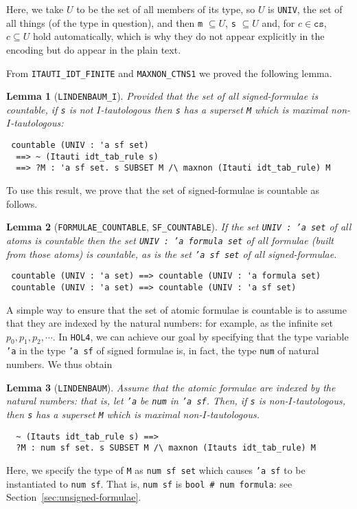 \documentclass[a4paper]{article}
\newtheorem{lemma}{Lemma}
\newcommand{\hol}{\texttt{HOL4}}
\begin{document}
Here, we take $U$ to be the set of all
members of its type, so $U$ is \texttt{UNIV}, the set of all things
(of the type in question), and then
\texttt{m} $\subseteq U$, \texttt{s} $\subseteq U$ and,
for $c \in \texttt{cs}$, $c \subseteq U$ hold automatically, which is
why they do not appear explicitly in the encoding but do appear in the
plain text.

From \texttt{ITAUTI\_IDT\_FINITE} and \texttt{MAXNON\_CTNS1} we proved
the following lemma.
\begin{lemma}[\texttt{LINDENBAUM\_I}]\label{LINDENBAUM-I}
  Provided that the set of all signed-formulae is countable, 
  if \texttt{s} is not $I$-tautologous then \texttt{s} has a superset 
\texttt{M} which is maximal non-$I$-tautologous:
\end{lemma}
\begin{verbatim}
 countable (UNIV : 'a sf set) 
  ==> ~ (Itauti idt_tab_rule s) 
  ==> ?M : 'a sf set. s SUBSET M /\ maxnon (Itauti idt_tab_rule) M
\end{verbatim}

To use this result, we prove that
the set of signed-formulae is countable as follows.
\begin{lemma}[\texttt{FORMULAE\_COUNTABLE}, \texttt{SF\_COUNTABLE}]
\label{FORMULAE-COUNTABLE}
\label{SF-COUNTABLE}
If the set \texttt{UNIV : 'a set} of all atoms is countable then the set
\texttt{UNIV : 'a formula set} of all formulae (built from
those atoms) is countable, as is the set
\texttt{'a sf set} of all signed-formulae.
\end{lemma}
\begin{verbatim}
 countable (UNIV : 'a set) ==> countable (UNIV : 'a formula set)
 countable (UNIV : 'a set) ==> countable (UNIV : 'a sf set)
\end{verbatim}

A simple way to ensure that the set of atomic formulae is countable is
to assume that they are indexed by the natural numbers: for example,
as the infinite set $p_0, p_1, p_2, \cdots$. In \hol{}, we can achieve
our goal by specifying that the type variable \texttt{'a} in the type
\texttt{'a sf} of signed formulae is, in fact, the type \texttt{num}
of natural numbers. 
We thus obtain %

\begin{lemma}[\texttt{LINDENBAUM}]\label{LINDENBAUM}
  Assume that the atomic formulae are indexed by the natural numbers:
  that is, let \texttt{'a} be \texttt{num} in \texttt{'a sf}.
  Then, if \texttt{s} is non-$I$-tautologous, then \texttt{s}
  has a superset \texttt{M} which is maximal non-$I$-tautologous.
\end{lemma}
\begin{verbatim}
  ~ (Itauts idt_tab_rule s) ==>
  ?M : num sf set. s SUBSET M /\ maxnon (Itauts idt_tab_rule) M
\end{verbatim}
Here, we specify the type of \texttt{M} as \texttt{num sf set}
which causes \texttt{'a sf} to be instantiated to \texttt{num sf}.
That is, \texttt{num sf} is \texttt{bool \# num formula}: see
Section~\ref{sec:unsigned-formulae}.
\end{document}
